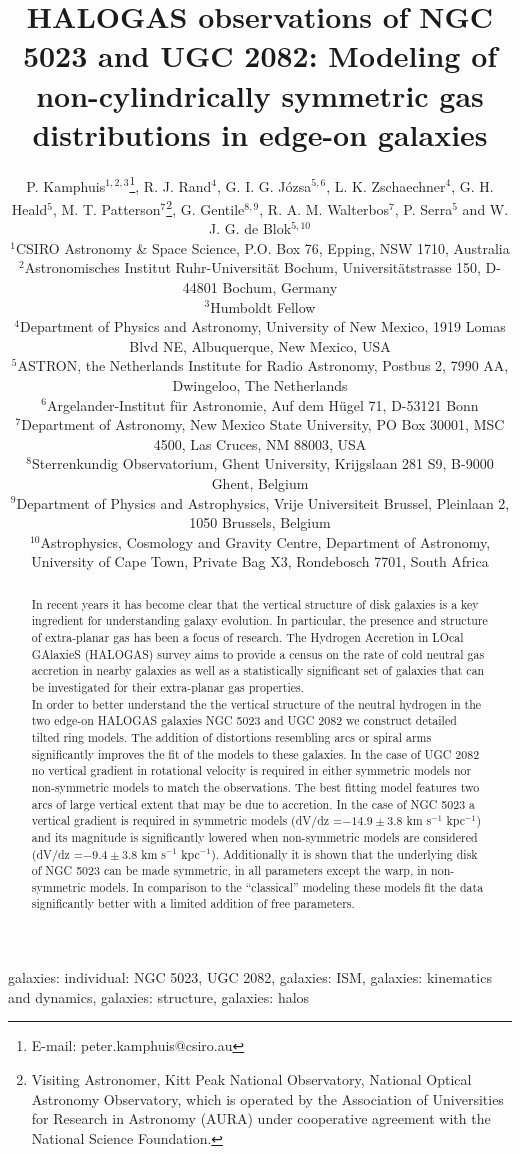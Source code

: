 \documentclass[useAMS,usenatbib]{mn2e}
\title[HALOGAS observations of NGC 5023 and UGC 2082]{HALOGAS observations of NGC 5023 and UGC 2082: Modeling of non-cylindrically symmetric gas distributions in edge-on galaxies}
\author[P. Kamphuis et al. ]{P. Kamphuis$^{1,2,3}$\thanks{E-mail: peter.kamphuis@csiro.au}, R. J. Rand$^{4}$,  G. I. G. J\'ozsa$^{5,6}$, L. K. Zschaechner$^{4}$, G. H. Heald$^{5}$,  \newauthor M. T. Patterson$^{7}$\thanks{Visiting Astronomer, Kitt Peak National Observatory, National Optical Astronomy Observatory, which is operated by the Association of Universities for Research in Astronomy (AURA) under cooperative agreement with the National Science Foundation.},  G. Gentile$^{8,9}$, R. A. M. Walterbos$^7$, P. Serra$^5$ and W. J. G. de Blok$^{5,10}$ \\
$^{1}$CSIRO Astronomy \& Space Science, P.O. Box 76, Epping, NSW 1710, Australia\\
$^{2}$Astronomisches Institut Ruhr-Universit\"at Bochum, Universit\"atstrasse 150, D-44801 Bochum, Germany\\
$^{3}$Humboldt Fellow\\
$^{4}$Department of Physics and Astronomy, University of New Mexico, 1919 Lomas Blvd NE, Albuquerque, New Mexico, USA\\
$^{5}$ASTRON, the Netherlands Institute for Radio Astronomy, Postbus 2, 7990 AA, Dwingeloo, The Netherlands \\
$^{6}$Argelander-Institut f\"ur Astronomie, Auf dem H\"ugel 71, D-53121 Bonn\\
$^{7}$Department of Astronomy, New Mexico State University, PO Box 30001, MSC 4500, Las Cruces, NM 88003, USA\\
$^{8}$Sterrenkundig Observatorium, Ghent University, Krijgslaan 281 S9, B-9000 Ghent, Belgium\\
$^{9}$Department of Physics and Astrophysics, Vrije Universiteit Brussel, Pleinlaan 2, 1050 Brussels, Belgium\\
$^{10}$Astrophysics, Cosmology and Gravity Centre, Department of Astronomy, University of Cape Town, Private Bag X3, Rondebosch 7701, South Africa}
\begin{document}
\date{}
\pagerange{\pageref{firstpage}--\pageref{lastpage}} 
\maketitle
\label{firstpage}
\begin{abstract}
In recent years it has become clear that the vertical structure of disk galaxies is a key ingredient for understanding galaxy evolution. In particular, the presence and structure of extra-planar gas has been a focus of research. The Hydrogen Accretion in LOcal GAlaxieS (HALOGAS) survey aims to provide a census on the rate of cold neutral gas accretion in nearby galaxies as well as a statistically significant set of galaxies that can be investigated for their extra-planar gas properties.\\   
\indent In order to better understand the the vertical structure of the neutral hydrogen in the two edge-on HALOGAS galaxies NGC 5023 and UGC 2082 we construct detailed tilted ring models. The addition of distortions resembling arcs or spiral arms significantly improves the fit of the models to these galaxies. In the case of UGC 2082 no vertical gradient in rotational velocity is required in either symmetric models nor non-symmetric models to match the observations.  The best fitting model features two arcs of large vertical extent that may be due to accretion.  In the case of NGC 5023 a vertical gradient is required in symmetric models  (dV/dz =$-14.9\pm3.8$ km s$^{-1}$ kpc$^{-1}$) and its magnitude is significantly lowered when non-symmetric models are considered (dV/dz =$-9.4\pm3.8$ km s$^{-1}$ kpc$^{-1}$). Additionally it is shown that the underlying disk of NGC 5023 can be made symmetric, in all parameters except the warp, in non-symmetric models. In comparison to the ``classical'' modeling these models fit the data significantly better with a limited addition of free parameters.  
\end{abstract}
\begin{keywords}
galaxies: individual: NGC 5023, UGC 2082, galaxies: ISM, galaxies: kinematics and dynamics, galaxies: structure, galaxies: halos
\end{keywords}
\end{document}
